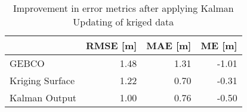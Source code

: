 \begin{table}[!ht]
\centering
\caption{Improvement in error metrics after applying Kalman Updating of kriged data}
\label{tab:Petten_gebco_raster_error}
\begin{tabular}{lrrr}
\toprule
 & RMSE [m] & MAE [m] & ME [m] \\
\midrule
GEBCO & 1.48 & 1.31 & -1.01 \\
Kriging Surface & 1.22 & 0.70 & -0.31 \\
Kalman Output& 1.00 & 0.76 & -0.50 \\
\bottomrule
\end{tabular}
\end{table}
